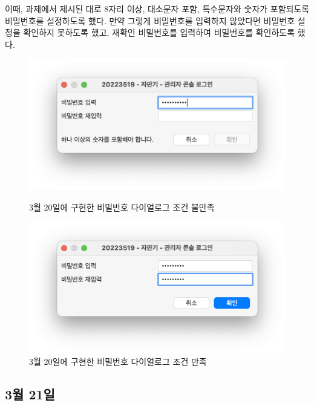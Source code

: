 \documentclass{oblivoir}
\begin{document}
    이때, 과제에서 제시된 대로 8자리 이상, 대소문자 포함, 특수문자와 숫자가 포함되도록
    비밀번호를 설정하도록 했다.
    만약 그렇게 비밀번호를 입력하지 않았다면 비밀번호 설정을 확인하지 못하도록 했고,
    재확인 비밀번호를 입력하여 비밀번호를 확인하도록 했다.
    \begin{figure}[h]
        \centering
        \begin{minipage}{.5\textwidth}
            \includegraphics[width=\textwidth]{images/dev-snapshop/0320-password-dialog-1}
            \caption{3월 20일에 구현한 비밀번호 다이얼로그 조건 불만족}
            \label{fig:0320-password-dialog-1}
        \end{minipage}%
        \begin{minipage}{.5\textwidth}
            \includegraphics[width=\textwidth]{images/dev-snapshop/0320-password-dialog-2}
            \caption{3월 20일에 구현한 비밀번호 다이얼로그 조건 만족}
            \label{fig:0320-password-dialog-2}
        \end{minipage}
    \end{figure}

    \subsection{3월 21일}
\end{document}

